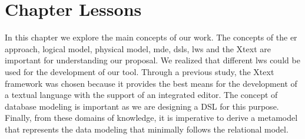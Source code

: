 
\section{Chapter Lessons}
\label{sec_back:lessons}

In this chapter we explore the main concepts of our work. The concepts of the \ac{er} approach, logical model, physical model, \ac{mde}, \acp{dsl}, \acp{lw} and the Xtext are important for understanding our proposal.
We realized that different \acp{lw} could be used for the development of our tool.
Through a previous study, the Xtext framework was chosen because it provides the best means for the development of a textual language with the support of an integrated editor.
The concept of database modeling is important as we are designing a DSL for this purpose.
Finally, from these domains of knowledge, it is imperative to derive a metamodel that represents the data modeling that minimally follows the relational model.